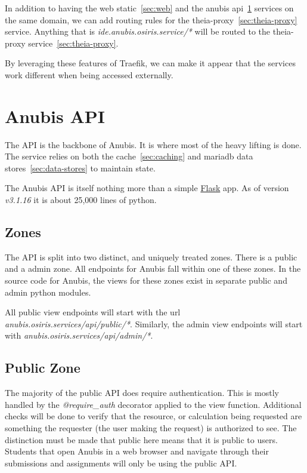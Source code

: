In addition to having the web static~\ref{sec:web} and the anubis api~\ref{sec:api} services on
the same domain, we can add routing rules for the theia-proxy~\ref{sec:theia-proxy} service.
Anything that is \textit{ide.anubis.osiris.service/*} will be routed to the theia-proxy service~\ref{sec:theia-proxy}.

By leveraging these features of Traefik, we can make it appear that
the services work different when being accessed externally.


\section{Anubis API}\label{sec:api}

The API is the backbone of Anubis.
It is where most of the heavy lifting is done.
The service relies on both the cache~\ref{sec:caching} and mariadb data
stores~\ref{sec:data-stores} to maintain state.

The Anubis API is itself nothing more than a simple \href{https://flask.palletsprojects.com/en/2.0.x/}{Flask} app.
As of version \textit{v3.1.16} it is about 25,000 lines of python.

\subsection{Zones}\label{subsec:api-zones}

The API is split into two distinct, and uniquely treated zones.
There is a public and a admin zone.
All endpoints for Anubis fall within one of these zones.
In the source code for Anubis, the views for these zones exist
in separate public and admin python modules.

All public view endpoints will start with the url \textit{anubis.osiris.services/api/public/*}.
Similarly, the admin view endpoints will start with \textit{anubis.osiris.services/api/admin/*}.

\subsection{Public Zone}\label{subsec:api-public-zone}
The majority of the public API does require authentication.
This is mostly handled by the \textit{@require\_auth} decorator applied to the view function.
Additional checks will be done to verify that the resource, or calculation being requested are
something the requester (the user making the request) is authorized to see.
The distinction must be made that public here means that it is public to users.
Students that open Anubis in a web browser and navigate through their submissions and assignments
will only be using the public API.

